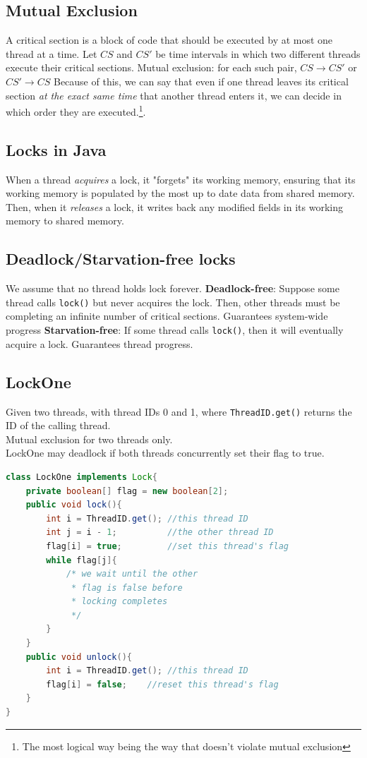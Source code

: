 \documentclass{article}
\begin{document}
\subsection{Mutual Exclusion}
A critical section is a block of code that should be executed by at most one thread at a time. 
\bigbreak Let $CS$ and $CS'$ be time intervals in which two different threads execute their critical sections.
\bigbreak Mutual exclusion: for each such pair, $CS \rightarrow CS'$ or $CS' \rightarrow CS$
\bigbreak Because of this, we can say that even if one thread leaves its critical section \textit{at the exact same time} that another thread enters it, we can decide in which order they are executed.\footnote{The most logical way being the way that doesn't violate mutual exclusion}.

\subsection{Locks in Java}
When a thread \textit{acquires} a lock, it "forgets" its working memory, ensuring that its working memory is populated by the most up to date data from shared memory. Then, when it \textit{releases} a lock, it writes back any modified fields in its working memory to shared memory.

\subsection{Deadlock/Starvation-free locks}
We assume that no thread holds lock forever. 
\bigbreak \textbf{Deadlock-free}: Suppose some thread calls \verb|lock()| but never acquires the lock. Then, other threads must be completing an infinite number of critical sections. Guarantees system-wide progress
\bigbreak \textbf{Starvation-free}: If some thread calls \verb|lock()|, then it will eventually acquire a lock. Guarantees thread progress.
\subsection{LockOne}
Given two threads, with thread IDs 0 and 1, where \verb|ThreadID.get()| returns the ID of the calling thread.
\\Mutual exclusion for two threads only.
\\LockOne may deadlock if both threads concurrently set their flag to true.
\begin{lstlisting}[language=Java]
class LockOne implements Lock{
    private boolean[] flag = new boolean[2];
    public void lock(){
        int i = ThreadID.get(); //this thread ID
        int j = i - 1;          //the other thread ID
        flag[i] = true;         //set this thread's flag
        while flag[j]{
            /* we wait until the other
             * flag is false before
             * locking completes 
             */
        } 
    }
    public void unlock(){
        int i = ThreadID.get(); //this thread ID
        flag[i] = false;    //reset this thread's flag
    }
}
\end{lstlisting}
\end{document}
